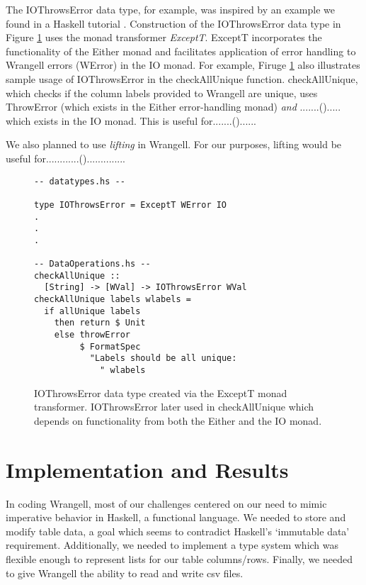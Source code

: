 \documentclass[preprint,nocopyrightspace]{sig-alternate}
\begin{document}
The IOThrowsError data type, for example, was inspired by an example we found in a Haskell tutorial \cite{writeScheme48}. Construction of the IOThrowsError data type in Figure \ref{IOThrowsError} uses the monad transformer \emph{ExceptT}. ExceptT incorporates the functionality of the Either monad and facilitates application of error handling to Wrangell errors (WError) in the IO monad. For example, Firuge \ref{IOThrowsError} also illustrates sample usage of IOThrowsError in the checkAllUnique function. checkAllUnique, which checks if the column labels provided to Wrangell are unique, uses ThrowError (which exists in the Either error-handling monad) \emph{and} .......()..... which exists in the IO monad. This is useful for.......()......

We also planned to use \emph{lifting} in Wrangell. For our purposes, lifting would be useful for............()..............

\begin{figure}
\begin{lstlisting}
-- datatypes.hs --

type IOThrowsError = ExceptT WError IO
.
.
.

-- DataOperations.hs --
checkAllUnique :: 
  [String] -> [WVal] -> IOThrowsError WVal
checkAllUnique labels wlabels = 
  if allUnique labels
    then return $ Unit 
    else throwError 
         $ FormatSpec 
           "Labels should be all unique: 
             " wlabels

\end{lstlisting}
\caption{IOThrowsError data type created via the ExceptT monad transformer. IOThrowsError later used in checkAllUnique which depends on functionality from both the Either and the IO monad.}
\label{IOThrowsError}
\end{figure}

  

\section{Implementation and Results}

In coding Wrangell, most of our challenges centered on our need to mimic imperative behavior in Haskell, a functional language. We needed to store and modify table data, a goal which seems to contradict Haskell's `immutable data' requirement. Additionally, we needed to implement a type system which was flexible enough to represent lists for our table columns/rows. Finally, we needed to give Wrangell the ability to read and write csv files.  
\end{document}

